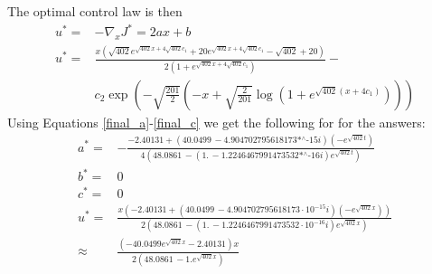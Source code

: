 \documentclass{article}
\begin{document}
The optimal control law is then
\begin{align}
	u^* =& - \nabla_xJ^* = 2ax + b \\
	u^* =& \frac{x \left(\sqrt{402} e^{\sqrt{402} x+4 \sqrt{402} c_1}+20 e^{\sqrt{402} x+4 \sqrt{402} c_1}-\sqrt{402}+20\right)}{2 \left(1+e^{\sqrt{402} x+4 \sqrt{402} c_1}\right)}-\\ 
	&c_2 \exp \left(-\sqrt{\frac{201}{2}} \left(-x+\sqrt{\frac{2}{201}} \log \left(1+e^{\sqrt{402} (x+4 c_1)}\right)\right)\right)
\end{align}
Using Equations \ref{final_a}-\ref{final_c} we get the following for for the answers:
\begin{align}
	a^* =& -\frac{-2.40131+(40.0499\, -\text{4.904702795618173$\grave{ }$*${}^{\wedge}$-15} i) \left(-e^{\sqrt{402} t}\right)}{4 \left(48.0861\, -(1.\, -\text{1.2246467991473532$\grave{ }$*${}^{\wedge}$-16} i) e^{\sqrt{402} t}\right)}\\
	b^* =& 0\\
	c^* =& 0\\
	u^* =&  \frac{x \left(-2.40131+(40.0499\, -\text{4.904702795618173}\cdot10^{-15} i) \left(-e^{\sqrt{402} x}\right)\right)}{2 \left(48.0861\, -(1.\, -\text{1.2246467991473532}\cdot10^{-16} i) e^{\sqrt{402} x}\right)}\\
	\approx & \frac{\left(-40.0499 e^{\sqrt{402} x}-2.40131\right) x}{2 \left(48.0861\, -1. e^{\sqrt{402} x}\right)}
\end{align}
\end{document}
